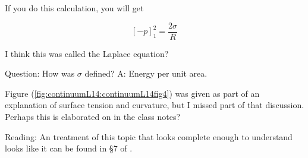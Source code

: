 If you do this calculation, you will get 

\begin{equation}\label{eqn:continuumL14:190}
[-p]^2_1 = \frac{ 2 \sigma}{R}
\end{equation}

I think this was called the Laplace equation?

Question: How was $\sigma$ defined?  A: Energy per unit area.  

Figure (\ref{fig:continuumL14:continuumL14fig4}) was given as part of an explanation of surface tension and curvature, but I missed part of that discussion.  Perhaps this is elaborated on in the class notes?


Reading: An treatment of this topic that looks complete enough to understand looks like it can be found in \S 7 of \citep{landau1987course}.
